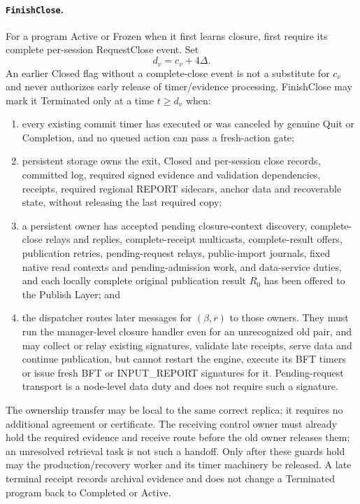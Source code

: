 \paragraph{\texttt{FinishClose}.}
For a program Active or Frozen when it first learns closure, first
require its complete per-session RequestClose event. Set
\[
 d_v=c_v+4\Delta.
\]
An earlier Closed flag without a complete-close event is not a substitute
for $c_v$ and never authorizes early release of timer/evidence processing.
FinishClose may mark it Terminated only at a time $t\ge d_v$ when:
\begin{enumerate}[label=(\roman*),itemsep=2pt]
\item every existing commit timer has executed or was canceled by
genuine Quit or Completion, and no queued action can pass a fresh-action
gate;
\item persistent storage owns the exit, Closed and per-session close records,
committed log, required signed evidence and validation dependencies,
receipts, required regional REPORT sidecars, anchor data and recoverable
state, without releasing the last
required copy;
\item a persistent owner has accepted pending closure-context discovery,
complete-close relays and replies, complete-receipt multicasts,
complete-result offers, publication retries, pending-request relays, public-import journals,
fixed native read contexts and pending-admission work, and data-service duties, and each locally complete original publication
result $R_0$ has been offered to the
Publish Layer; and
\item the dispatcher routes later messages for $(\beta,r)$ to those
owners. They must run the manager-level closure handler even for an
unrecognized old pair, and may collect or relay existing signatures,
validate late receipts, serve data and continue publication, but cannot restart the
engine, execute its BFT timers or issue fresh BFT or INPUT\_REPORT
signatures for it. Pending-request transport is a node-level data duty
and does not require such a signature.
\end{enumerate}
The ownership transfer may be local to the same correct replica; it
requires no additional agreement or certificate. The receiving control
owner must already hold the required evidence and receive route before
the old owner releases them; an unresolved retrieval task is not such
a handoff. Only after these
guards hold may the production/recovery worker and its timer machinery
be released. A late terminal receipt records archival evidence and does
not change a Terminated program back to Completed or Active.

